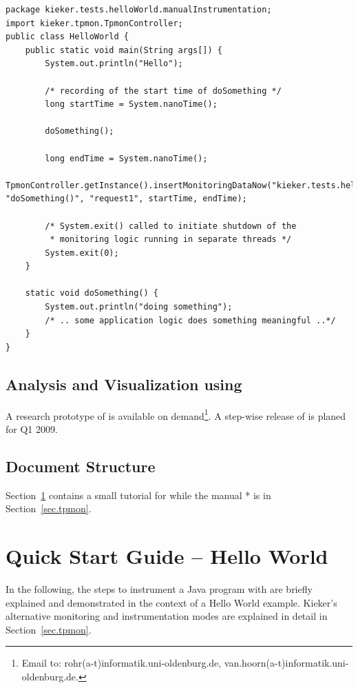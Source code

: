 \documentclass[a4paper,12pt]{scrartcl}
\begin{document}
\begin{lstlisting}[caption={\footnotesize\texttt{src/kieker/tests/helloWorld/manualInstrumentation/HelloWorld.java}},label={manualInstrumentation}]
package kieker.tests.helloWorld.manualInstrumentation;
import kieker.tpmon.TpmonController;
public class HelloWorld {
    public static void main(String args[]) {
        System.out.println("Hello");

        /* recording of the start time of doSomething */
        long startTime = System.nanoTime();

        doSomething();

        long endTime = System.nanoTime();
        TpmonController.getInstance().insertMonitoringDataNow("kieker.tests.helloWorld.manualInstrumentation.HelloWorld", "doSomething()", "request1", startTime, endTime);

        /* System.exit() called to initiate shutdown of the
         * monitoring logic running in separate threads */
        System.exit(0);
    }

    static void doSomething() {
        System.out.println("doing something");
        /* .. some application logic does something meaningful ..*/
    }
}
\end{lstlisting}

\subsection{Analysis and Visualization using \tpan{}}
A research prototype of \tpan{} is available on demand\footnote{Email to: rohr(a-t)informatik.uni-oldenburg.de, van.hoorn(a-t)informatik.uni-oldenburg.de.}. A step-wise release of \tpan{} is planed for Q1 2009.

\subsection{Document Structure}

Section~\ref{sec.tpmon.tutorial} contains a small tutorial for \tpmon{} while the manual \tpmon{}* is in Section~\ref{sec.tpmon}.%


\section{\tpmon{} Quick Start Guide -- Hello World}\label{sec.tpmon.tutorial}
In the following, the steps to instrument a Java program with \tpmon{} are briefly explained and demonstrated in the context of a Hello World example. Kieker's alternative monitoring and instrumentation modes are explained in detail in Section~\ref{sec.tpmon}.
\end{document}
